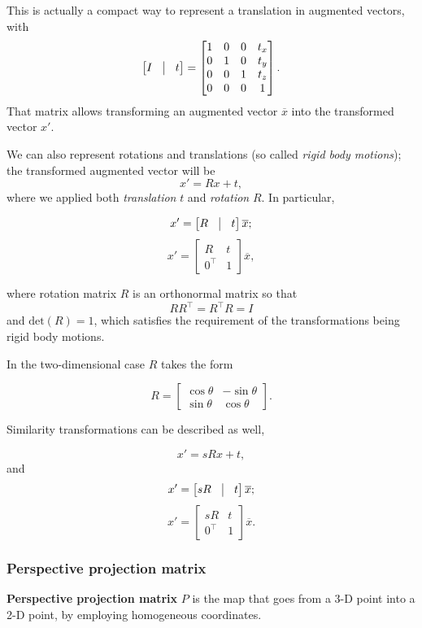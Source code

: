 \documentclass[10pt]{report}
\begin{document}
This is actually a compact way to represent a translation in augmented
vectors, with
\[\begin{bmatrix} I & \vline & t\end{bmatrix} = \begin{bmatrix} 1 & 0 & 0 & t_x\\ 0 & 1 & 0 & t_y\\ 0 & 0 & 1 & t_z\\ 0 & 0 & 0 & 1\end{bmatrix}.\]
That matrix allows transforming an augmented vector \(\overline{x}\)
into the transformed vector \(x'\).

We can also represent rotations and translations (so called \emph{rigid body
motions}); the transformed augmented vector will be \[x' = Rx + t,\] where we
applied both \emph{translation} \(t\) and \emph{rotation} \(R\). In particular,

\[x' = \begin{bmatrix} R & \vline & t\end{bmatrix}\overline{x};\] \[x' = \begin{bmatrix} R & t\\ 0^\top & 1 \end{bmatrix}\overline{x}, \]

where rotation matrix \(R\) is an orthonormal matrix so that
\[RR^\top = R^\top R = I\] and \(\mbox{det}(R) = 1\), which satisfies the
requirement of the transformations being rigid body motions.

In the two-dimensional case \(R\) takes the form

\[R = \begin{bmatrix} \cos\theta & -\sin\theta\\ \sin\theta & \cos\theta \end{bmatrix}.\]

Similarity transformations can be described as well,

\[x' = sRx + t,\] and
\[x' = \begin{bmatrix} sR & \vline & t\end{bmatrix}\overline{x};\] \[x' = \begin{bmatrix} sR & t\\ 0^\top & 1 \end{bmatrix}\overline{x}. \]

\subsubsection{Perspective projection matrix}
\label{perspective-projection-matrix}
\textbf{Perspective projection matrix} \(P\) is the map that goes from a 3-D
point into a 2-D point, by employing homogeneous coordinates.
\end{document}
